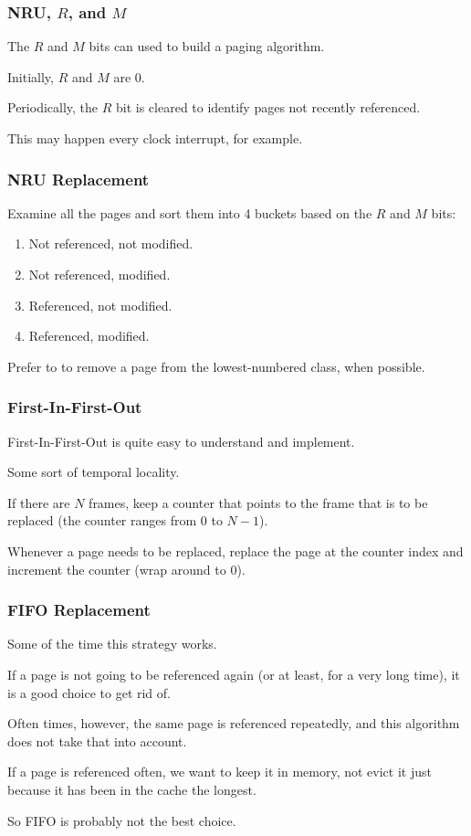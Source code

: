 \begin{frame}
\frametitle{NRU, $R$, and $M$}

The $R$ and $M$ bits can used to build a paging algorithm.

Initially, $R$ and $M$ are 0. 

Periodically, the $R$ bit is cleared to identify pages not recently referenced. 

This may happen every clock interrupt, for example.

\end{frame}


\begin{frame}
\frametitle{NRU Replacement}

Examine all the pages and sort them into 4 buckets based on the $R$ and $M$ bits:

\begin{enumerate}
	\item Not referenced, not modified.
	\item Not referenced, modified.
	\item Referenced, not modified.
	\item Referenced, modified.
\end{enumerate}

Prefer to to remove a page from the lowest-numbered class, when possible. 

\end{frame}

\begin{frame}
\frametitle{First-In-First-Out}

First-In-First-Out is quite easy to understand and implement. 

Some sort of temporal locality. 

If there are $N$ frames, keep a counter that points to the frame that is to be replaced (the counter ranges from $0$ to $N-1$). 

Whenever a page needs to be replaced, replace the page at the counter index and increment the counter (wrap around to 0).


\end{frame}

\begin{frame}
\frametitle{FIFO Replacement}

Some of the time this strategy works. 

If a page is not going to be referenced again (or at least, for a very long time), it is a good choice to get rid of. 

Often times, however, the same page is referenced repeatedly, and this algorithm does not take that into account. 

If a page is referenced often, we want to keep it in memory, not evict it just because it has been in the cache the longest. 

So FIFO is probably not the best choice.

\end{frame}


